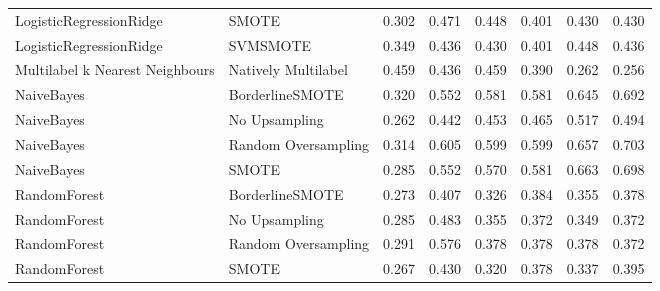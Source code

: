 \begin{tabular}{llllllll}
        LogisticRegressionRidge &                         SMOTE & 0.302 &                     0.471 &                 0.448 &                  0.401 &                                   0.430 &    0.430 \\
        LogisticRegressionRidge &                      SVMSMOTE & 0.349 &                     0.436 &                 0.430 &                  0.401 &                                   0.448 &    0.436 \\
Multilabel k Nearest Neighbours &           Natively Multilabel & 0.459 &                     0.436 &                 0.459 &                  0.390 &                                   0.262 &    0.256 \\
                     NaiveBayes &               BorderlineSMOTE & 0.320 &                     0.552 &                 0.581 &                  0.581 &                                   0.645 &    0.692 \\
                     NaiveBayes &                 No Upsampling & 0.262 &                     0.442 &                 0.453 &                  0.465 &                                   0.517 &    0.494 \\
                     NaiveBayes &           Random Oversampling & 0.314 &                     0.605 &                 0.599 &                  0.599 &                                   0.657 &    0.703 \\
                     NaiveBayes &                         SMOTE & 0.285 &                     0.552 &                 0.570 &                  0.581 &                                   0.663 &    0.698 \\
                   RandomForest &               BorderlineSMOTE & 0.273 &                     0.407 &                 0.326 &                  0.384 &                                   0.355 &    0.378 \\
                   RandomForest &                 No Upsampling & 0.285 &                     0.483 &                 0.355 &                  0.372 &                                   0.349 &    0.372 \\
                   RandomForest &           Random Oversampling & 0.291 &                     0.576 &                 0.378 &                  0.378 &                                   0.378 &    0.372 \\
                   RandomForest &                         SMOTE & 0.267 &                     0.430 &                 0.320 &                  0.378 &                                   0.337 &    0.395 \\

\end{tabular}
